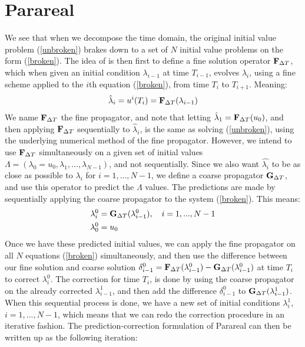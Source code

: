 \section{Parareal}\label{Parareal_sec}
We see that when we decompose the time domain, the original initial value problem (\ref{unbroken}) brakes down to a set of $N$ initial value problems on the form (\ref{broken}). The idea of \cite{baffico2002parallel} is then first to define a fine solution operator $\bold F_{\Delta T}$, which when given an initial condition $\lambda_{i-1}$ at time $T_{i-1}$, evolves $\lambda_i$, using a fine scheme applied to the $i$th equation (\ref{broken}), from time $T_i$ to $T_{i+1}$. Meaning:
\begin{align*}
\hat \lambda_{i}= u^i(T_{i})=\bold F_{\Delta T}(\lambda_{i-1})
\end{align*} 
We name $\bold F_{\Delta T}$ the fine propagator, and note that letting $\hat \lambda_{1}=\bold F_{\Delta T}(u_0)$, and then applying $\bold F_{\Delta T}$ sequentially to $\hat \lambda_{i}$, is the same as solving (\ref{unbroken}), using the underlying numerical method of the fine propagator. However, we intend to use $\bold F_{\Delta T}$ simultaneously on a given set of initial values $\Lambda=(\lambda_0=u_0,\lambda_1,...,\lambda_{N-1})$, and not sequentially. Since we also want $\hat{\lambda_i}$ to be as close as possible to $\lambda_i$ for $i=1,...,N-1$, we define a coarse propagator $\bold G_{\Delta T}$, and use this operator to predict the $\Lambda$ values. The predictions are made by sequentially applying the coarse propagator to the system (\ref{broken}). This means:
\begin{align}
\lambda_i^0 &= \bold G_{\Delta T}(\lambda_{i-1}^0),\quad i=1,...,N-1 \\
\lambda_0^0&=u_0
\end{align} 
Once we have these predicted initial values, we can apply the fine propagator on all $N$ equations (\ref{broken}) simultaneously, and then use the difference between our fine solution and coarse solution $\delta_{i-1}^0= \bold F_ {\Delta T}( \lambda_{i-1}^0)-\bold G_ {\Delta T}( \lambda_{i-1}^0)$ at time $T_{i}$ to correct $\lambda_i^0$. The correction for time $T_i$, is done by using the coarse propagator on the already corrected $\lambda_{i-1}^1$, and then add the difference $\delta_{i-1}^0$ to $\bold G_ {\Delta T}(\lambda_{i-1}^1)$. When this sequential process is done, we have a new set of initial conditions $\lambda_i^1$, $i=1,...,N-1$, which means that we can redo the correction procedure in an iterative fashion. The prediction-correction formulation of Parareal can then be written up as the following iteration:
